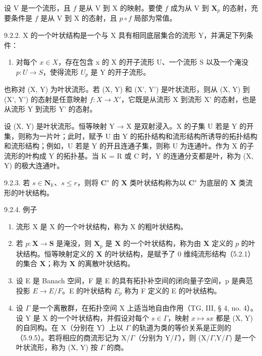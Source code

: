 设 V 是一个流形，且 \(f\) 是从 V 到 X 的映射。要使 \(f\) 成为从 V 到 \(\mathbf{X}_{p}\) 的态射，充要条件是 \(f\) 是从 V 到 X 的态射，且 \(p \circ f\) 局部为常值。

9.2.2. X 的一个叶状结构是一个与 X 具有相同底层集合的流形 Y，并满足下列条件：

\begin{enumerate}
\def\labelenumi{(\Alph{enumi})}
\setcounter{enumi}{5}
\tightlist
\item
  对每个 \(x \in X\)，存在包含 x 的 X 的开子流形 U、一个流形 S 以及一个淹没 \(p: U \to S\)，使得流形 \(U_{p}\) 是 Y 的开子流形。
\end{enumerate}

也称对 (X, Y) 为叶状流形。若 (X, Y) 和 (X', Y') 是叶状流形，则从 (X, Y) 到 (X', Y') 的态射是任意映射 \(f: X \to X'\)，它既是从流形 X 到流形 X' 的态射，也是从流形 Y 到流形 Y' 的态射。

设 (X, Y) 是叶状流形。恒等映射 Y → X 是双射浸入。X 的子集 U 若是 Y 的开集，则称为一片叶；此时，赋予 U 由 Y 的拓扑结构和流形结构所诱导的拓扑结构和流形结构；例如，U 若是 Y 的开且连通子集，则称 U 为连通叶。作为 X 的子流形的叶构成 Y 的拓扑基。当 K = R 或 C 时，Y 的连通分支都是叶，称为 (X, Y) 的极大连通叶。

9.2.3. 若 \(s \in \mathbf{N}_{\mathbb{K}}\)、\(s \leqslant r\)，则将 \(\mathbf{C}^s\) 的 \(\mathbf{X}\) 类叶状结构称为以 \(\mathbf{C}^s\) 为底层的 \(\mathbf{X}\) 类流形的叶状结构。

9.2.4. 例子

\begin{enumerate}
\def\labelenumi{\alph{enumi})}
\item
  流形 X 是 X 的一个叶状结构，称为 X 的粗叶状结构。
\item
  若 \(p: \mathbf{X} \to \mathbf{S}\) 是淹没，则 \(\mathbf{X}_p\) 是 \(\mathbf{X}\) 的一个叶状结构，称为由 \(\mathbf{X}\) 定义的 \(p\) 的叶状结构。恒等映射定义的 \(\mathbf{X}\) 的叶状结构，是赋予了 0 维纯流形结构（5.2.1）的集合 \(\mathbf{X}\)；称为 \(\mathbf{X}\) 的离散叶状结构。
\item
  设 E 是 Banach 空间，F 是 E 的具有拓扑补空间的闭向量子空间，p 是典范投影 \(E \rightarrow E/F\)。E 的叶状结构 \(E_{p}\) 称为 F 定义的 E 的叶状结构。
\item
  设 \(\Gamma\) 是一个离散群，在拓扑空间 X 上适当地自由作用（TG, III, § 4, no. 4）。设 Y 是 X 的一个叶状结构，并假设对每个 \(s \in \Gamma\)，映射 \(x \mapsto sx\) 都是 (X, Y) 的自同构。在 X（分别在 Y）上以 \(\Gamma\) 的轨道为类的等价关系是正则的（5.9.5）。若将相应的商流形记为 X/\(\Gamma\)（分别为 Y/\(\Gamma\)），则 (X/\(\Gamma\),Y/\(\Gamma\)) 是一个叶状流形，称为 (X, Y) 按 \(\Gamma\) 的商。
\end{enumerate}

